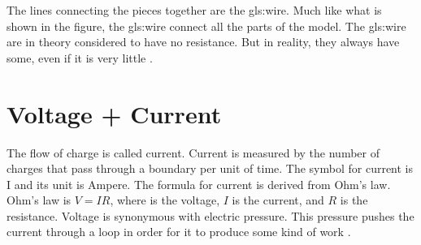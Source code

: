 \documentclass[class={myRUCProject}, crop=false]{standalone}
\begin{document}
The lines connecting the pieces together are the \gls{gls:wire}. Much like what is shown in the figure, the \gls{gls:wire} connect all the parts of the model. The \gls{gls:wire} are in theory considered to have no resistance. But in reality, they always have some, even if it is very little \cite{}. 


 \section{Voltage + Current}
The flow of charge is called current. Current is measured by the number of charges that pass through a boundary per unit of time. The symbol for current is I and its unit is Ampere. The formula for current is derived from Ohm's law. Ohm's law is \(V=IR\), where  is the voltage, \(I\) is the current, and \(R\) is the resistance. Voltage is synonymous with electric pressure. This pressure pushes the current through a loop in order for it to produce some kind of work \cite{}. 




\end{document}
